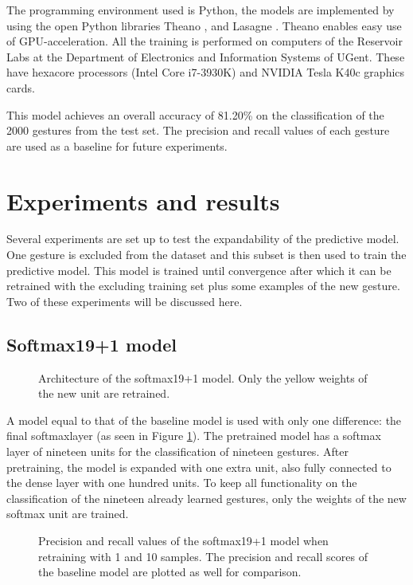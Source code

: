 \documentclass[twocolumn]{phdsymp} %
\begin{document}
The programming environment used is Python, the models are implemented by using the open Python libraries Theano \cite{theano}, and Lasagne \cite{lasagne}. Theano enables easy use of GPU-acceleration. All the training is performed on computers of the Reservoir Labs at the Department of Electronics and Information Systems of UGent. These have hexacore processors (Intel Core i7-3930K) and NVIDIA Tesla K40c graphics cards.

This model achieves an overall accuracy of 81.20\% on the classification of the 2000 gestures from the test set. The precision and recall values of each gesture are used as a baseline for future experiments.
\section{Experiments and results}
Several experiments are set up to test the expandability of the predictive model. One gesture is excluded from the dataset and this subset is then used to train the predictive model. This model is trained until convergence after which it can be retrained with the excluding training set plus some examples of the new gesture. Two of these experiments will be discussed here.

\subsection{Softmax19+1 model}
\begin{figure}
	\centering
	\def\svgwidth{0.6\columnwidth}
	
	\caption{Architecture of the softmax19+1 model. Only the yellow weights of the new unit are retrained.}\label{fig:19x1-model}
\end{figure}
A model equal to that of the baseline model is used with only one difference: the final softmaxlayer (as seen in Figure \ref{fig:19x1-model}). The pretrained model has a softmax layer of nineteen units for the classification of nineteen gestures. After pretraining, the model is expanded with one extra unit, also fully connected to the dense layer with one hundred units. To keep all functionality on the classification of the nineteen already learned gestures, only the weights of the new softmax unit are trained.

\begin{figure}
	\def\svgwidth{\columnwidth}
	
	\caption{Precision and recall values of the softmax19+1 model when retraining with 1 and 10 samples. The precision and recall scores of the baseline model are plotted as well for comparison.}\label{fig:19x1}
\end{figure}
\end{document}
